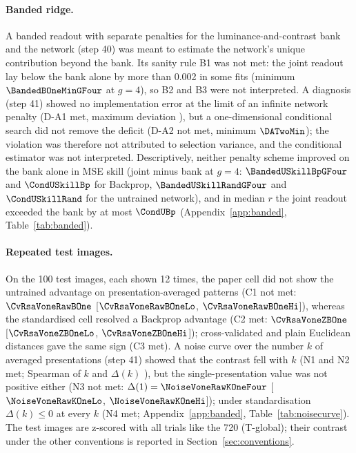 \paragraph{Banded ridge.} A banded readout with separate penalties for the luminance-and-contrast bank
and the network (step 40) was meant to estimate the network's unique contribution beyond the bank. Its
sanity rule B1 was not met: the joint readout lay below the bank alone by more than 0.002 in some fits
(minimum $\BandedBOneMinGFour$ at $g = 4$), so B2 and B3 were not interpreted. A diagnosis (step 41)
showed no implementation error at the limit of an infinite network penalty (D-A1 met, maximum
deviation \DAOneDev), but a one-dimensional conditional search did not remove the deficit (D-A2 not met,
minimum $\DATwoMin$); the violation was therefore not attributed to selection variance, and the
conditional estimator was not interpreted. Descriptively, neither penalty scheme improved on the bank
alone in MSE skill (joint minus bank at $g = 4$: $\BandedUSkillBpGFour$ and $\CondUSkillBp$ for
Backprop, $\BandedUSkillRandGFour$ and $\CondUSkillRand$ for the untrained network), and in median $r$
the joint readout exceeded the bank by at most $\CondUBp$ (Appendix~\ref{app:banded},
Table~\ref{tab:banded}).

\paragraph{Repeated test images.} On the 100 test images, each shown 12 times, the paper cell did not
show the untrained advantage on presentation-averaged patterns (C1 not met: $\CvRsaVoneRawBOne$
[$\CvRsaVoneRawBOneLo$, $\CvRsaVoneRawBOneHi$]), whereas the standardised cell resolved a Backprop
advantage (C2 met: $\CvRsaVoneZBOne$ [$\CvRsaVoneZBOneLo$, $\CvRsaVoneZBOneHi$]); cross-validated and
plain Euclidean distances gave the same sign (C3 met). A noise curve over the number $k$ of averaged
presentations (step 41) showed that the contrast fell with $k$ (N1 and N2 met; Spearman of $k$ and
$\Delta(k)$ \NTwoSpearman), but the single-presentation value was not positive either (N3 not met:
$\Delta(1) = \NoiseVoneRawKOneFour$ [$\NoiseVoneRawKOneLo$, $\NoiseVoneRawKOneHi$]); under standardisation
$\Delta(k) \leq 0$ at every $k$ (N4 met; Appendix~\ref{app:banded}, Table~\ref{tab:noisecurve}). The
test images are z-scored with all trials like the 720 (T-global); their contrast under the other conventions
is reported in Section~\ref{sec:conventions}.
